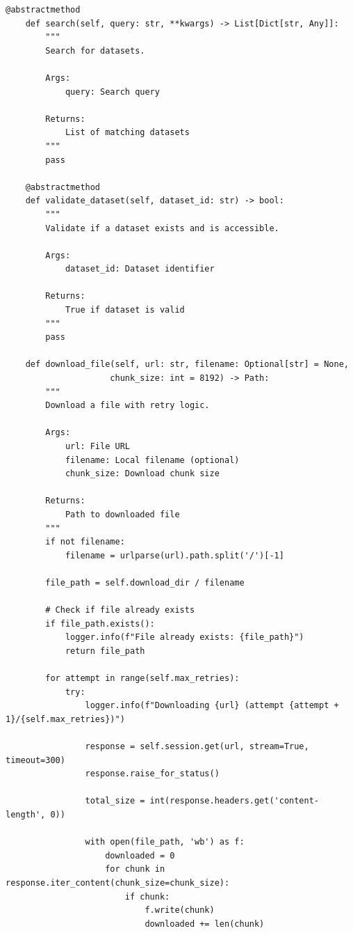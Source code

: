 \documentclass[a4paper,11pt]{article}
\begin{document}
\begin{lstlisting}[style=pythonstyle]
    @abstractmethod
    def search(self, query: str, **kwargs) -> List[Dict[str, Any]]:
        """
        Search for datasets.
        
        Args:
            query: Search query
            
        Returns:
            List of matching datasets
        """
        pass
    
    @abstractmethod
    def validate_dataset(self, dataset_id: str) -> bool:
        """
        Validate if a dataset exists and is accessible.
        
        Args:
            dataset_id: Dataset identifier
            
        Returns:
            True if dataset is valid
        """
        pass
    
    def download_file(self, url: str, filename: Optional[str] = None, 
                     chunk_size: int = 8192) -> Path:
        """
        Download a file with retry logic.
        
        Args:
            url: File URL
            filename: Local filename (optional)
            chunk_size: Download chunk size
            
        Returns:
            Path to downloaded file
        """
        if not filename:
            filename = urlparse(url).path.split('/')[-1]
        
        file_path = self.download_dir / filename
        
        # Check if file already exists
        if file_path.exists():
            logger.info(f"File already exists: {file_path}")
            return file_path
        
        for attempt in range(self.max_retries):
            try:
                logger.info(f"Downloading {url} (attempt {attempt + 1}/{self.max_retries})")
                
                response = self.session.get(url, stream=True, timeout=300)
                response.raise_for_status()
                
                total_size = int(response.headers.get('content-length', 0))
                
                with open(file_path, 'wb') as f:
                    downloaded = 0
                    for chunk in response.iter_content(chunk_size=chunk_size):
                        if chunk:
                            f.write(chunk)
                            downloaded += len(chunk)
                            

\end{lstlisting}
\end{document}
